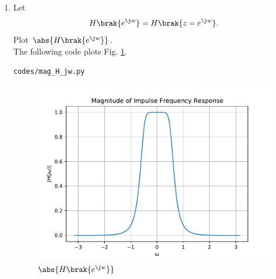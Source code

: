 \documentclass[journal,12pt,twocolumn]{IEEEtran}
\renewcommand\thesection{\arabic{section}}
\begin{document}
\begin{enumerate}[label=\thesection.\arabic*,ref=\thesection.\theenumi]
%
\item 
Let
\begin{equation}
H\brak{e^{\j w}} = H\brak{z = e^{\j w}}.
\end{equation}
Plot $\abs{H\brak{e^{\j w}}}$.
\\
\solution
The following code plots Fig. \ref{fig:H(jw)}.
\begin{lstlisting}
codes/mag_H_jw.py
\end{lstlisting}
\begin{figure}[!ht]
\centering
\includegraphics[width=\columnwidth]{./figs/mag_H(jw)}
\caption{$\abs{H\brak{e^{\j w}}}$}
\label{fig:H(jw)}
\end{figure}
\end{enumerate}
\end{document}
